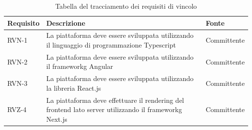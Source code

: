 \begin{longtable}{| p{} | p{} | p{} |}
\caption{Tabella del tracciamento dei requisiti di vincolo}
\label{tab:requisiti-vincolo}
\hline
\textbf{Requisito} & \textbf{Descrizione} & \textbf{Fonte}\\

\hline

RVN-1    & La piattaforma deve essere sviluppata utilizzando il linguaggio di programmazione Typescript & Committente \\

\hline

RVN-2    & La piattaforma deve essere sviluppata utilizzando il \gls{frameworkg} Angular & Committente \\

\hline

RVN-3    & La piattaforma deve essere sviluppata utilizzando la libreria React.js & Committente \\

\hline

RVZ-4    & La piattaforma deve effettuare il rendering del \gls{frontend} lato server utilizzando il \gls{frameworkg} Next.js & Committente \\

\hline

\end{longtable}